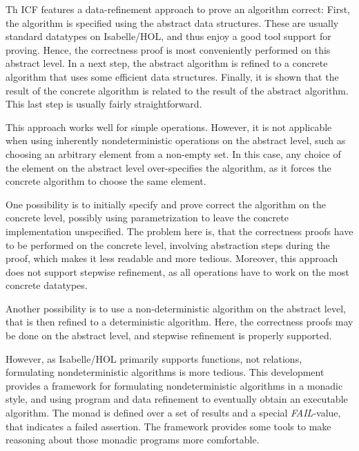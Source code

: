 \documentclass[11pt,a4paper]{book}
\begin{document}
Th ICF features a data-refinement approach to prove an algorithm correct:
First, the algorithm is specified using the abstract data structures. These are
usually standard datatypes on Isabelle/HOL, and thus enjoy a good tool support
for proving. Hence, the correctness proof is most conveniently performed on this
abstract level. In a next step, the abstract algorithm is refined to a 
concrete algorithm that uses some efficient data structures. Finally, it is 
shown that the result of the concrete algorithm is related to the result of 
the abstract algorithm. This last step is usually fairly straightforward.

This approach works well for simple operations. However, it is not 
applicable when using inherently nondeterministic operations on the abstract level,
such as choosing an arbitrary element from a non-empty set. In this case, any 
choice of the element on the abstract level
over-specifies the algorithm, as it forces the concrete algorithm to choose the
same element.

One possibility is to initially specify and prove correct the algorithm on 
the concrete level, possibly using parametrization to leave the concrete
implementation unspecified. The problem here is, that the correctness proofs
have to be performed on the concrete level, involving abstraction steps during 
the proof, which makes it less readable and more tedious. Moreover, this 
approach does not support stepwise refinement, as all operations have to work on
the most concrete datatypes.

Another possibility is to use a non-deterministic algorithm on the abstract 
level, that is then refined to a deterministic algorithm. Here, the 
correctness proofs may be done on the abstract level, and stepwise refinement is
properly supported.

However, as Isabelle/HOL  primarily supports functions, not relations,
formulating   nondeterministic  algorithms   is  more   tedious.  This
development  provides  a  framework for  formulating  nondeterministic
algorithms in a  monadic style, and using program  and data refinement
to  eventually obtain an  executable algorithm.  The monad  is defined
over a set of results and a special {\em FAIL}-value, that indicates a
failed assertion.  The framework provides some tools to make reasoning
about those monadic programs more comfortable.
\end{document}
